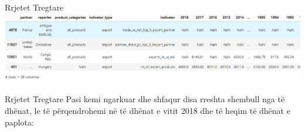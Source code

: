 \documentclass[
  ignorenonframetext,
]{beamer}
\begin{document}
\begin{frame}{Rrjetet Tregtare}
\protect\hypertarget{rrjetet-tregtare-2}{}
\includegraphics{./Figs/trade1.png}
\end{frame}

\begin{frame}{Rrjetet Tregtare}
\protect\hypertarget{rrjetet-tregtare-3}{}
Pasi kemi ngarkuar dhe shfaqur disa rreshta shembull nga të dhënat, le
të përqendrohemi në të dhënat e vitit 2018 dhe të heqim të dhënat e
paplota:
\end{frame}
\end{document}
